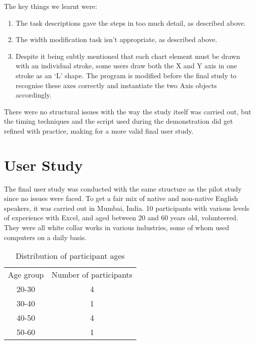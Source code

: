 The key things we learnt were:
\begin{enumerate}
\item The task descriptions gave the steps in too much detail, as described above.
\item The width modification task isn't appropriate, as described above.
\item Despite it being subtly mentioned that each chart element must be drawn with an individual stroke, some users draw both the X and Y axis in one stroke as an `L' shape. The program is modified before the final study to recognise these axes correctly and instantiate the two Axis objects accordingly. 
\end{enumerate}

There were no structural issues with the way the study itself was carried out, but the timing techniques and the script used during the demonstration did get refined with practice, making for a more valid final user study.

\section{User Study}
The final user study was conducted with the same structure as the pilot study since no issues were faced. To get a fair mix of native and non-native English speakers, it was carried out in Mumbai, India. 10 participants with various levels of experience with Excel, and aged between 20 and 60 years old, volunteered. They were all white collar works in various industries, some of whom used computers on a daily basis.

\begin{table}
\begin{center}
\begin{tabular}{c c}
Age group & Number of participants \\
20-30 & 4 \\
30-40 & 1 \\
40-50 & 4 \\
50-60 & 1 \\

\end{tabular}
\end{center}
\caption{Distribution of participant ages}
\end{table}

